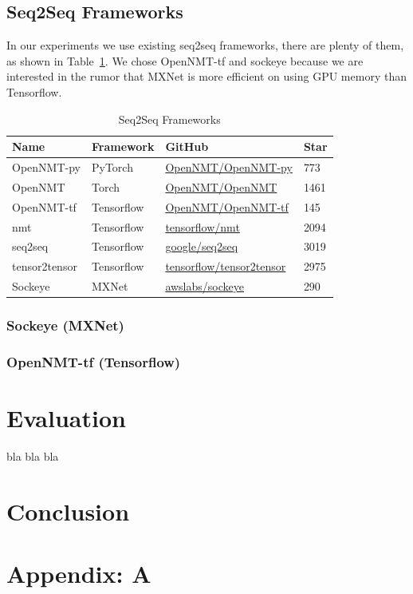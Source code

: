 \documentclass{article}
\begin{document}
\subsection{Seq2Seq Frameworks}
\label{subsec:seq2seq-frameworks}

In our experiments we use existing seq2seq frameworks, there are plenty of them, as shown in Table~\ref{table:seq2seq-frameworks}.
We chose OpenNMT-tf and sockeye because we are interested in the rumor that MXNet is more efficient on using GPU memory than Tensorflow.

\begin{table}[h]
    \caption{Seq2Seq Frameworks}
    \label{table:seq2seq-frameworks}
    \centering
    \begin{tabular}{llll}
        \toprule
        Name & Framework & GitHub & Star \\
        \midrule
        OpenNMT-py & PyTorch & \href{https://github.com/OpenNMT/OpenNMT-py}{OpenNMT/OpenNMT-py} & 773 \\
        OpenNMT & Torch & \href{https://github.com/OpenNMT/OpenNMT}{OpenNMT/OpenNMT} & 1461 \\
        OpenNMT-tf & Tensorflow & \href{https://github.com/OpenNMT/OpenNMT-tf}{OpenNMT/OpenNMT-tf} & 145 \\
        nmt & Tensorflow & \href{https://github.com/tensorflow/nmt}{tensorflow/nmt} & 2094 \\
        seq2seq & Tensorflow & \href{https://github.com/google/seq2seq}{google/seq2seq} & 3019 \\
        tensor2tensor & Tensorflow & \href{https://github.com/tensorflow/tensor2tensor}{tensorflow/tensor2tensor} & 2975 \\
        Sockeye & MXNet & \href{https://github.com/awslabs/sockeye}{awslabs/sockeye} & 290 \\
        \bottomrule
    \end{tabular}
\end{table}


\subsubsection{Sockeye (MXNet)}
\label{subsubsec:sockeye}

\subsubsection{OpenNMT-tf (Tensorflow)}
\label{subsubsec:opennmt-tf}

\section{Evaluation}
\label{sec:evaluation}
bla bla bla

\section{Conclusion}
\label{sec:conclusion}

\printbibliography

\section*{Appendix: A}
\label{sec:appendix:a}
\end{document}

